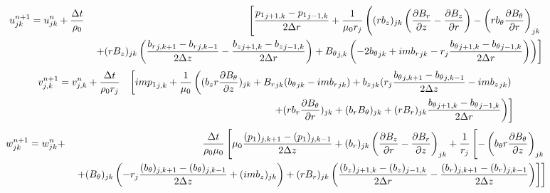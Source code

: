 \documentclass[%
 reprint,
 amsmath,amssymb,
 aps,
]{revtex4-2}
\begin{document}
\begin{eqnarray*}
u_{jk} ^{n+1} = u_{jk} ^n + \frac{\Delta t}{\rho_0} & & \left[ \frac{{p_1}_{j+1, k} - {p_1}_{j-1, k}}{2 \Delta r} + \frac{1}{\mu_0 r_j} \left( (r b_z)_{jk} \left( \pdv{B_r}{z} - \pdv{B_z}{r} \right) - \left( r b_\theta \pdv{B_\theta}{r} \right)_{jk} \right. \right. \\
& & \left. \left. + (r B_z)_{jk} \left(\frac{{b_r}_{j, k+1} - {b_r}_{j, k-1}}{2 \Delta z} - \frac{{b_z}_{j+1, k} - {b_z}_{j-1, k}}{2 \Delta r} \right) + {B_\theta}_{j, k} \left(-2 {b_\theta}_{jk} + i m {b_r}_{jk} - r_j \frac{{b_\theta}_{j+1, k} - {b_\theta}_{j-1, k}}{2 \Delta r} \right) \right) \right]
\end{eqnarray*}
\begin{eqnarray*}
v_{j, k} ^{n+1}  = v_{j, k} ^{n} + \frac{\Delta t}{\rho_0 r_j} & & \left[ i m {p_1}_{j, k} + \frac{1}{\mu_0} \left( (b_z r \pdv{B_\theta}{z} )_{jk} + {B_r}_{jk} ({b_\theta}_{jk} - i m {b_r}_{jk}) + {b_z}_{jk} (r_j \frac{{b_\theta}_{j, k+1} - {b_\theta}_{j, k-1}}{2 \Delta z} - i m {b_z}_{jk}) \right. \right. \\
& & \left. \left. + (r b_r \pdv{B_\theta}{r})_{jk} + (b_r B_\theta)_{jk} + (r B_r)_{jk} \frac{{b_\theta}_{j+1, k} - {b_\theta}_{j-1, k}}{2 \Delta r} \right) \right]
\end{eqnarray*}
\begin{eqnarray*}
w_{jk} ^{n+1} = w_{jk} ^n + & &  \frac{\Delta t}{\rho_0 \mu_0} \left[ \mu_0 \frac{(p_1)_{j, k+1} - (p_1)_{j, k-1}}{2 \Delta z} +  (b_r)_{jk} \left( \pdv{B_z}{r} - \pdv{B_r}{z} \right)_{jk} + \frac{1}{r_j} \left[ - \left(b_\theta r \pdv{B_\theta}{z} \right)_{jk} \right. \right.  \\
 & & \left. \left. + (B_\theta)_{jk} \left(- r_j \frac{(b_\theta)_{j, k+1} - (b_\theta)_{j, k-1}}{2 \Delta z} + (i m b_z)_{jk} \right) + (r B_r)_{jk} \left( \frac{(b_z)_{j+1, k} - (b_z)_{j-1, k}}{2 \Delta r} - \frac{(b_r)_{j, k+1} - (b_r)_{j, k-1}}{2 \Delta z} \right) \right]  \right]
\end{eqnarray*}
\end{document}
